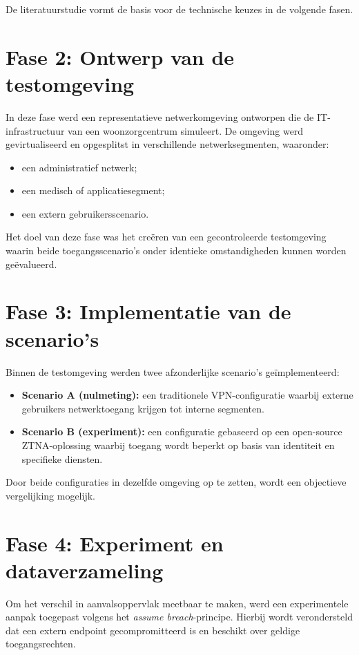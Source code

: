 De literatuurstudie vormt de basis voor de technische keuzes in de volgende fasen.

\section{Fase 2: Ontwerp van de testomgeving}

In deze fase werd een representatieve netwerkomgeving ontworpen die de IT-infrastructuur van een woonzorgcentrum simuleert. De omgeving werd gevirtualiseerd en opgesplitst in verschillende netwerksegmenten, waaronder:
\begin{itemize}
	\item een administratief netwerk;
	\item een medisch of applicatiesegment;
	\item een extern gebruikersscenario.
\end{itemize}

Het doel van deze fase was het creëren van een gecontroleerde testomgeving waarin beide toegangsscenario’s onder identieke omstandigheden kunnen worden geëvalueerd.

\section{Fase 3: Implementatie van de scenario’s}

Binnen de testomgeving werden twee afzonderlijke scenario’s geïmplementeerd:

\begin{itemize}
	\item \textbf{Scenario A (nulmeting):} een traditionele VPN-configuratie waarbij externe gebruikers netwerktoegang krijgen tot interne segmenten.
	\item \textbf{Scenario B (experiment):} een configuratie gebaseerd op een open-source ZTNA-oplossing waarbij toegang wordt beperkt op basis van identiteit en specifieke diensten.
\end{itemize}

Door beide configuraties in dezelfde omgeving op te zetten, wordt een objectieve vergelijking mogelijk.

\section{Fase 4: Experiment en dataverzameling}

Om het verschil in aanvalsoppervlak meetbaar te maken, werd een experimentele aanpak toegepast volgens het \textit{assume breach}-principe. Hierbij wordt verondersteld dat een extern endpoint gecompromitteerd is en beschikt over geldige toegangsrechten.

